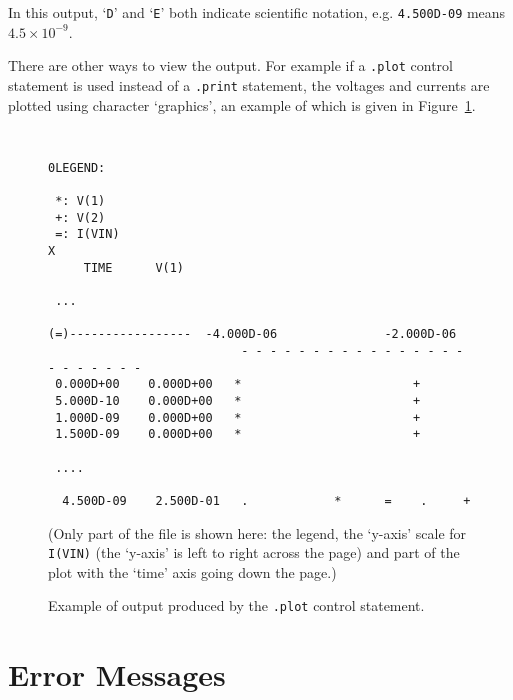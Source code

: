In this output, `{\tt D}' and `{\tt E}' both indicate scientific
notation, e.g. {\tt 4.500D-09}  means $4.5 \times 10^{-9}$.

There are other ways to view the output.  For example if a {\tt .plot}
control statement is used instead of a {\tt .print} statement, the
voltages and currents are plotted using character `graphics', an
example of which is given in Figure~\ref{cg}.
%
\begin{figure}
{\tt
\begin{verbatim}
0LEGEND:

 *: V(1)
 +: V(2)
 =: I(VIN)
X
     TIME      V(1)

 ...

(=)-----------------  -4.000D-06               -2.000D-06
                           - - - - - - - - - - - - - - - - - - - - - - -
 0.000D+00    0.000D+00   *                        +
 5.000D-10    0.000D+00   *                        +
 1.000D-09    0.000D+00   *                        +
 1.500D-09    0.000D+00   *                        +

 ....

  4.500D-09    2.500D-01   .            *      =    .     +
\end{verbatim}
}
(Only part of the file is shown here:  the legend, the `y-axis' scale for
{\tt I(VIN)} (the `y-axis' is left to right across the page) and part of
the plot with the `time' axis going down the page.)
\caption{Example of output produced by the {\tt .plot} control statement.}
\label{cg}
\end{figure}


\section{Error Messages}
\label{err1}

